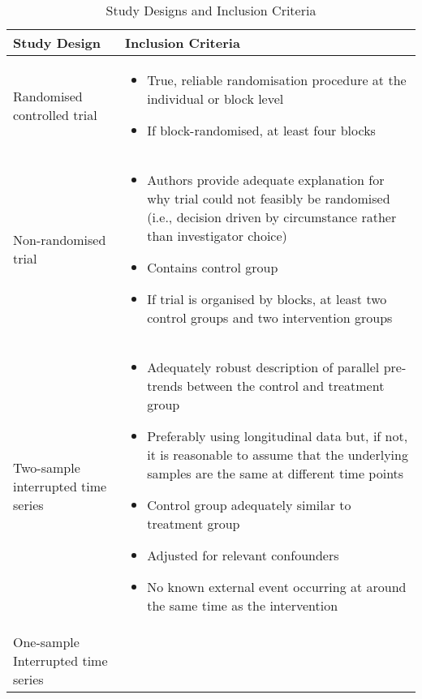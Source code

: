 \documentclass[12pt]{article}
\begin{document}
\begin{table}
  \caption{Study Designs and Inclusion Criteria}
  \begin{center}
      \begin{threeparttable}
        \small
        \begin{tabularx}{\textwidth}{|p{3cm}|X|}
        \hline
        \textbf{Study Design} & \textbf{Inclusion Criteria} \\ \hline
        Randomised controlled trial &
        \begin{itemize}[noitemsep,topsep=0pt]
          \item True, reliable randomisation procedure at the individual or block level
          \item If block-randomised, at least four blocks
        \end{itemize}
          \\ \hline
        Non-randomised trial &
        \begin{itemize}[noitemsep,topsep=0pt]
          \item Authors provide adequate explanation for why trial could not feasibly be randomised (i.e., decision driven by circumstance rather than investigator choice)
          \item Contains control group
          \item If trial is organised by blocks, at least two control groups and two intervention groups
        \end{itemize}
          \\ \hline
        Two-sample interrupted time series\tnote{1} &
        \begin{itemize}[noitemsep,topsep=0pt]
          \item Adequately robust description of parallel pre-trends between the control and treatment group
          \item Preferably using longitudinal data but, if not, it is reasonable to assume that the underlying samples are the same at different time points
          \item Control group adequately similar to treatment group
          \item Adjusted for relevant confounders
          \item No known external event occurring at around the same time as the intervention
        \end{itemize}
          \\ \hline
        One-sample Interrupted time series &
        \begin{itemize}[noitemsep,topsep=0pt]

\end{itemize}
\end{tabularx}
\end{threeparttable}
\end{center}
\end{table}
\end{document}
